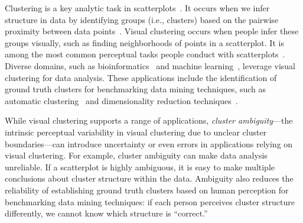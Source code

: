 

Clustering is a key analytic task in scatterplots~\cite{quadri21tvcg, xia22tvcg, xia21cgna}.
It occurs when we infer structure in data by identifying groups (i.e., clusters) based on the pairwise proximity between data points~\cite{amar2005low}.
Visual clustering occurs when people infer these groups visually, such as finding neighborhoods of points in a scatterplot.
It is among the most common perceptual tasks people conduct with scatterplots~\cite{sarikaya2018scatterplots}.
% 
Diverse domains, such as bioinformatics~\cite{shi10cbm, shannon03phar} and machine learning~\cite{kahng18tvcg}, leverage visual clustering for data analysis. These applications include the identification of ground truth clusters for benchmarking data mining techniques, such as automatic clustering~\cite{aupetit19vis, xia21cgna} and dimensionality reduction techniques~\cite{etemadpour2014perception, xia22tvcg}.
% 


While visual clustering supports a range of applications, 
\textit{cluster ambiguity}---the intrinsic perceptual variability in visual clustering due to unclear cluster boundaries---can introduce uncertainty or even errors in applications relying on visual clustering. 
% 
For example, 
cluster ambiguity can make data analysis unreliable. If a scatterplot is highly ambiguous,
it is easy to make multiple conclusions about cluster structure within the data. 
% 
% 
Ambiguity also reduces the reliability of establishing ground truth clusters based on human perception for benchmarking data mining techniques: if each person perceives cluster structure differently, we cannot know which structure is ``correct.''

